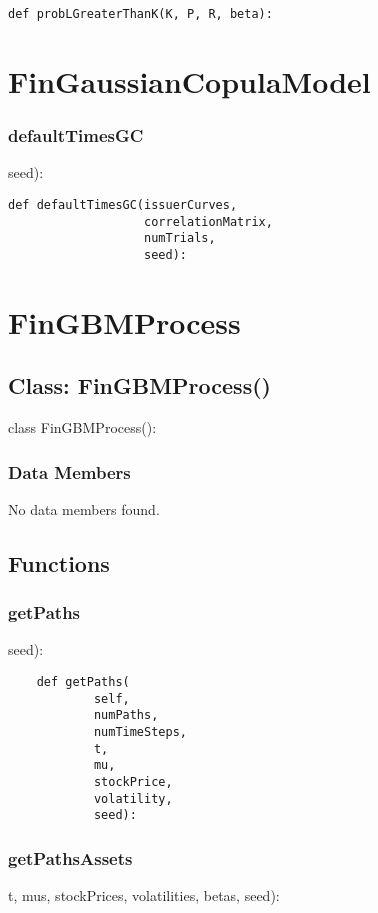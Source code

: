 \documentclass[twoside,11pt]{book}
\begin{document}
\begin{lstlisting}
def probLGreaterThanK(K, P, R, beta):
\end{lstlisting}

\newpage
\section{FinGaussianCopulaModel}

\subsubsection*{{\bf defaultTimesGC}}
seed): 

\begin{lstlisting}
def defaultTimesGC(issuerCurves,
                   correlationMatrix,
                   numTrials,
                   seed):
\end{lstlisting}

\newpage
\section{FinGBMProcess}

\subsection*{Class: FinGBMProcess()}
class FinGBMProcess(): 

\subsubsection*{Data Members}
No data members found.

\subsection*{Functions}

\subsubsection*{{\bf getPaths}}
seed): 

\begin{lstlisting}
    def getPaths(
            self,
            numPaths,
            numTimeSteps,
            t,
            mu,
            stockPrice,
            volatility,
            seed):
\end{lstlisting}

\subsubsection*{{\bf getPathsAssets}}
t, mus, stockPrices, volatilities, betas, seed): 
\end{document}
